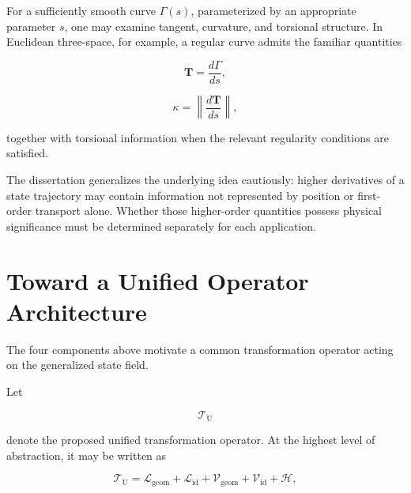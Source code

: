 \documentclass[12pt,oneside]{book}
\begin{document}
For a sufficiently smooth curve \(\Gamma(s)\), parameterized by
an appropriate parameter \(s\), one may examine tangent,
curvature, and torsional structure. In Euclidean three-space,
for example, a regular curve admits the familiar quantities

\begin{equation}
    \mathbf{T}
    =
    \frac{d\Gamma}{ds},
    \label{eq:tangent-vector}
\end{equation}

\begin{equation}
    \kappa
    =
    \left\|
        \frac{d\mathbf{T}}{ds}
    \right\|,
    \label{eq:curve-curvature}
\end{equation}

together with torsional information when the relevant
regularity conditions are satisfied.

The dissertation generalizes the underlying idea cautiously:
higher derivatives of a state trajectory may contain
information not represented by position or first-order
transport alone. Whether those higher-order quantities possess
physical significance must be determined separately for each
application.


\section{Toward a Unified Operator Architecture}
\label{sec:unified-operator-architecture}

The four components above motivate a common transformation
operator acting on the generalized state field.

Let

\begin{equation}
    \mathcal{T}_{\mathrm{U}}
\end{equation}

denote the proposed unified transformation operator. At the
highest level of abstraction, it may be written as

\begin{equation}
    \mathcal{T}_{\mathrm{U}}
    =
    \mathcal{L}_{\mathrm{geom}}
    +
    \mathcal{L}_{\mathrm{id}}
    +
    \mathcal{V}_{\mathrm{geom}}
    +
    \mathcal{V}_{\mathrm{id}}
    +
    \mathcal{H},
    \label{eq:unified-transformation-operator}
\end{equation}
\end{document}
